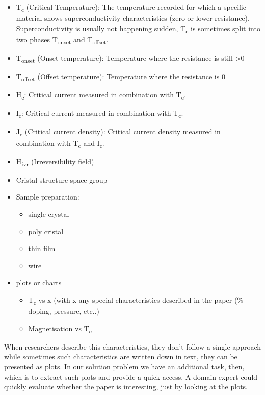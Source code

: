 \documentclass{article}
\begin{document}
\begin{itemize}
    \item T\textsubscript{c} (Critical Temperature): The temperature recorded for which a specific material shows superconductivity characteristics (zero or lower resistance). Superconductivity is usually not happening sudden, T\textsubscript{c} is sometimes split into two phases T\textsubscript{onset} and T\textsubscript{offset}.
    \item T\textsubscript{onset} (Onset temperature): Temperature where the resistance is still \textgreater 0
    \item T\textsubscript{offset} (Offset temperature): Temperature where the resistance is 0
    \item H\textsubscript{c}: Critical current measured in combination with T\textsubscript{c}.
    \item I\textsubscript{c}: Critical current measured in combination with T\textsubscript{c}.
    \item J\textsubscript{c} (Critical current density): Critical current density measured in combination with T\textsubscript{c} and I\textsubscript{c}.
    \item H\textsubscript{ivr} (Irreversibility field) %
    \item Cristal structure space group %
    \item Sample preparation:
    \begin{itemize}
        \item single crystal
        \item poly cristal 
        \item thin film
        \item wire
    \end{itemize}%
    \item plots or charts
    \begin{itemize}
        \item T\textsubscript{c} vs x (with x any special characteristics described in the paper (\% doping, pressure, etc..) 
        \item Magnetisation vs T\textsubscript{c}
    \end{itemize}
\end{itemize}

When researchers describe this characteristics, they don't follow a single approach while sometimes such characteristics are written down in text, they can be presented as plots. 
In our solution problem we have an additional task, then, which is to extract such plots and provide a quick access. A domain expert could quickly evaluate whether the paper is interesting, just by looking at the plots. 
\end{document}
